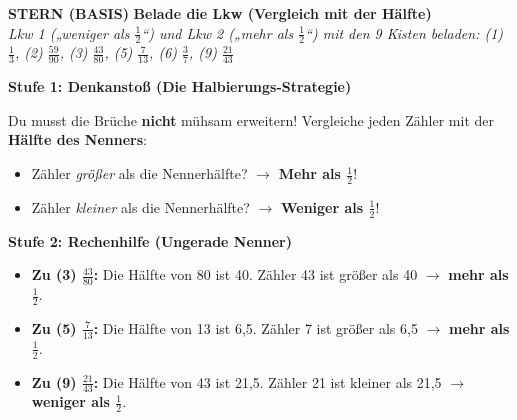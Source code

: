 \documentclass[a4paper,10pt]{article}
\newcommand{\mFrac}[2]{\frac{#1}{#2}}
\begin{document}
\begin{tcolorbox}[
    enhanced, colback=white, colframe=primaryBlue, arc=3mm, boxrule=1.2pt,
    left=4.5mm, right=4.5mm, top=2.5mm, bottom=2.5mm, height=12.9cm
]
    \begin{center}
        {\color{lvlGreen}\textbf{\faStar{} STERN (BASIS)}}\quad
        {\color{primaryBlue}\large\bfseries {}\quad Belade die Lkw (Vergleich mit der Hälfte)}\\[1mm]
        {\footnotesize\textit{Lkw 1 („weniger als $\mFrac{1}{2}$“) und Lkw 2 („mehr als $\mFrac{1}{2}$“) mit den 9 Kisten beladen: (1) $\mFrac{1}{3}$, (2) $\mFrac{59}{90}$, (3) $\mFrac{43}{80}$, (5) $\mFrac{7}{13}$, (6) $\mFrac{3}{7}$, (9) $\mFrac{21}{43}$}}
    \end{center}
    \vspace{0.5mm}

    \begin{tcolorbox}[colback=step1Bg, colframe=step1Border, arc=2mm, boxrule=0.7pt, left=3mm, right=3mm, top=1.8mm, bottom=1.8mm]
        {\color{step1Text}\bfseries\faLightbulb\enskip Stufe 1: Denkanstoß (Die Halbierungs-Strategie)}\\[0.8mm]
        {\small
        Du musst die Brüche \textbf{nicht} mühsam erweitern! Vergleiche jeden Zähler mit der \textbf{Hälfte des Nenners}:
        \begin{itemize}[leftmargin=4mm, itemsep=0.2pt, topsep=1pt]
            \item Zähler \textit{größer} als die Nennerhälfte? $\rightarrow$ \textbf{Mehr als $\mFrac{1}{2}$}!
            \item Zähler \textit{kleiner} als die Nennerhälfte? $\rightarrow$ \textbf{Weniger als $\mFrac{1}{2}$}!
        \end{itemize}
        }
    \end{tcolorbox}
    \vspace{0.8mm}

    \begin{tcolorbox}[colback=step2Bg, colframe=step2Border, arc=2mm, boxrule=0.7pt, left=3mm, right=3mm, top=1.8mm, bottom=1.8mm]
        {\color{step2Text}\bfseries\faSearch\enskip Stufe 2: Rechenhilfe (Ungerade Nenner)}\\[0.8mm]
        {\small
        \begin{itemize}[leftmargin=4mm, itemsep=0.2pt, topsep=1pt]
            \item \textbf{Zu (3) $\mFrac{43}{80}$:} Die Hälfte von 80 ist 40. Zähler 43 ist größer als 40 $\rightarrow$ \textbf{mehr als $\mFrac{1}{2}$}.
            \item \textbf{Zu (5) $\mFrac{7}{13}$:} Die Hälfte von 13 ist 6,5. Zähler 7 ist größer als 6,5 $\rightarrow$ \textbf{mehr als $\mFrac{1}{2}$}.
            \item \textbf{Zu (9) $\mFrac{21}{43}$:} Die Hälfte von 43 ist 21,5. Zähler 21 ist kleiner als 21,5 $\rightarrow$ \textbf{weniger als $\mFrac{1}{2}$}.
        \end{itemize}
        }
    \end{tcolorbox}
    \vspace{0.8mm}


\end{tcolorbox}
\end{document}
